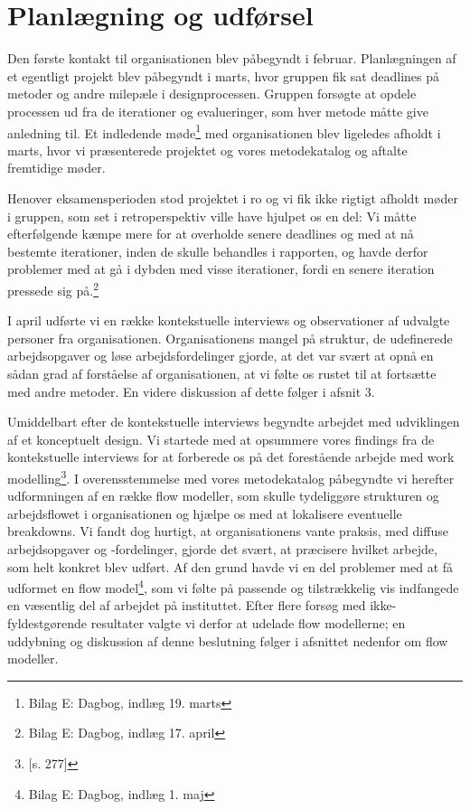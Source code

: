 \section{Planlægning og udførsel}
Den første kontakt til organisationen blev påbegyndt i februar. Planlægningen af et egentligt projekt blev påbegyndt i marts, hvor gruppen fik sat deadlines på metoder og andre milepæle i designprocessen. Gruppen forsøgte at opdele processen ud fra de iterationer og evalueringer, som hver metode måtte give anledning til. Et indledende møde\footnote{Bilag E: Dagbog, indlæg 19. marts} med organisationen blev ligeledes afholdt i marts, hvor vi præsenterede projektet og vores metodekatalog og aftalte fremtidige møder.

Henover eksamensperioden stod projektet i ro og vi fik ikke rigtigt afholdt møder i gruppen, som set i retroperspektiv ville have hjulpet os en del: Vi måtte efterfølgende kæmpe mere for at overholde senere deadlines og med at nå bestemte iterationer, inden de skulle behandles i rapporten, og havde derfor problemer med at gå i dybden med visse iterationer, fordi en senere iteration pressede sig på.\footnote{Bilag E: Dagbog, indlæg 17. april}

I april udførte vi en række kontekstuelle interviews og observationer af udvalgte personer fra organisationen. Organisationens mangel på struktur, de udefinerede arbejdsopgaver og  løse arbejdsfordelinger gjorde, at det var svært at opnå en sådan grad af forståelse af organisationen, at vi følte os rustet til at fortsætte med andre metoder. En videre diskussion af dette følger i afsnit 3.

Umiddelbart efter de kontekstuelle interviews begyndte arbejdet med udviklingen af et konceptuelt design. Vi startede med at opsummere vores findings fra de kontekstuelle interviews for at forberede os på det forestående arbejde med work modelling\footnote{\citep{Benyon}[s. 277]}.
I overensstemmelse med vores metodekatalog påbegyndte vi herefter udformningen af en række flow modeller, som skulle tydeliggøre strukturen og arbejdsflowet i organisationen og hjælpe os med at lokalisere eventuelle breakdowns. 
Vi fandt dog hurtigt, at organisationens vante praksis, med diffuse arbejdsopgaver og -fordelinger, gjorde det svært, at præcisere hvilket arbejde, som helt konkret blev udført. Af den grund havde vi en del problemer med at få udformet en flow model\footnote{Bilag E: Dagbog, indlæg 1. maj}, som vi følte på passende og tilstrækkelig vis indfangede en væsentlig del af arbejdet på instituttet. Efter flere forsøg med ikke-fyldestgørende resultater valgte vi derfor at udelade flow modellerne; en uddybning og diskussion af denne beslutning følger i afsnittet nedenfor om flow modeller.

